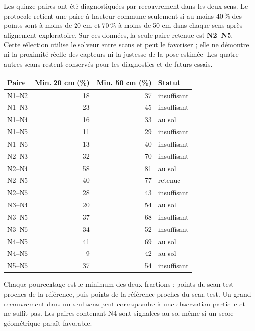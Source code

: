 \documentclass[11pt,a4paper]{article}
\begin{document}
Les quinze paires ont été diagnostiquées par recouvrement dans les deux sens.
Le protocole retient une paire à hauteur commune seulement si au moins
40\,\% des points sont à moins de 20 cm et 70\,\% à moins de 50 cm
dans chaque sens après alignement exploratoire. Sur ces données, la seule
paire retenue est \textbf{N2--N5}. Cette sélection utilise le solveur entre
scans et peut le favoriser ; elle ne démontre ni la proximité réelle des
capteurs ni la justesse de la pose estimée. Les quatre autres scans restent
conservés pour les diagnostics et de futurs essais.
\begin{center}\small
\begin{tabular}{lrrl}\toprule
Paire & Min. 20 cm (\%) & Min. 50 cm (\%) & Statut\\\midrule
N1--N2 & 18 & 37 & insuffisant \\
N1--N3 & 23 & 45 & insuffisant \\
N1--N4 & 16 & 33 & au sol \\
N1--N5 & 11 & 29 & insuffisant \\
N1--N6 & 13 & 40 & insuffisant \\
N2--N3 & 32 & 70 & insuffisant \\
N2--N4 & 58 & 81 & au sol \\
N2--N5 & 40 & 77 & retenue \\
N2--N6 & 28 & 43 & insuffisant \\
N3--N4 & 20 & 54 & au sol \\
N3--N5 & 37 & 68 & insuffisant \\
N3--N6 & 34 & 52 & insuffisant \\
N4--N5 & 41 & 69 & au sol \\
N4--N6 & 9 & 42 & au sol \\
N5--N6 & 37 & 54 & insuffisant \\
\bottomrule\end{tabular}
\end{center}
Chaque pourcentage est le minimum des deux fractions : points du scan test
proches de la référence, puis points de la référence proches du scan test.
Un grand recouvrement dans un seul sens peut correspondre à une observation
partielle et ne suffit pas. Les paires contenant N4 sont signalées
\og au sol\fg{} même si un score géométrique paraît favorable.
\end{document}
